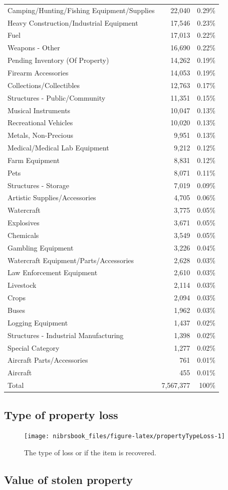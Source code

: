 \documentclass[
  12pt,
  openany]{book}
\begin{document}
\begin{longtable}[]{@{}lrr@{}}
Camping/Hunting/Fishing Equipment/Supplies & 22,040 & 0.29\%\tabularnewline
Heavy Construction/Industrial Equipment & 17,546 & 0.23\%\tabularnewline
Fuel & 17,013 & 0.22\%\tabularnewline
Weapons - Other & 16,690 & 0.22\%\tabularnewline
Pending Inventory (Of Property) & 14,262 & 0.19\%\tabularnewline
Firearm Accessories & 14,053 & 0.19\%\tabularnewline
Collections/Collectibles & 12,763 & 0.17\%\tabularnewline
Structures - Public/Community & 11,351 & 0.15\%\tabularnewline
Musical Instruments & 10,047 & 0.13\%\tabularnewline
Recreational Vehicles & 10,020 & 0.13\%\tabularnewline
Metals, Non-Precious & 9,951 & 0.13\%\tabularnewline
Medical/Medical Lab Equipment & 9,212 & 0.12\%\tabularnewline
Farm Equipment & 8,831 & 0.12\%\tabularnewline
Pets & 8,071 & 0.11\%\tabularnewline
Structures - Storage & 7,019 & 0.09\%\tabularnewline
Artistic Supplies/Accessories & 4,705 & 0.06\%\tabularnewline
Watercraft & 3,775 & 0.05\%\tabularnewline
Explosives & 3,671 & 0.05\%\tabularnewline
Chemicals & 3,549 & 0.05\%\tabularnewline
Gambling Equipment & 3,226 & 0.04\%\tabularnewline
Watercraft Equipment/Parts/Accessories & 2,628 & 0.03\%\tabularnewline
Law Enforcement Equipment & 2,610 & 0.03\%\tabularnewline
Livestock & 2,114 & 0.03\%\tabularnewline
Crops & 2,094 & 0.03\%\tabularnewline
Buses & 1,962 & 0.03\%\tabularnewline
Logging Equipment & 1,437 & 0.02\%\tabularnewline
Structures - Industrial Manufacturing & 1,398 & 0.02\%\tabularnewline
Special Category & 1,277 & 0.02\%\tabularnewline
Aircraft Parts/Accessories & 761 & 0.01\%\tabularnewline
Aircraft & 455 & 0.01\%\tabularnewline
Total & 7,567,377 & 100\%\tabularnewline
\bottomrule
\end{longtable}


\hypertarget{type-of-property-loss}{%
\subsection{Type of property loss}\label{type-of-property-loss}}

\begin{figure}

{\centering \texttt{[image: nibrsbook\_files/figure-latex/propertyTypeLoss-1]} 

}

\caption{The type of loss or if the item is recovered.}\label{fig:propertyTypeLoss}
\end{figure}

\hypertarget{value-of-stolen-property}{%
\subsection{Value of stolen property}\label{value-of-stolen-property}}
\end{document}
